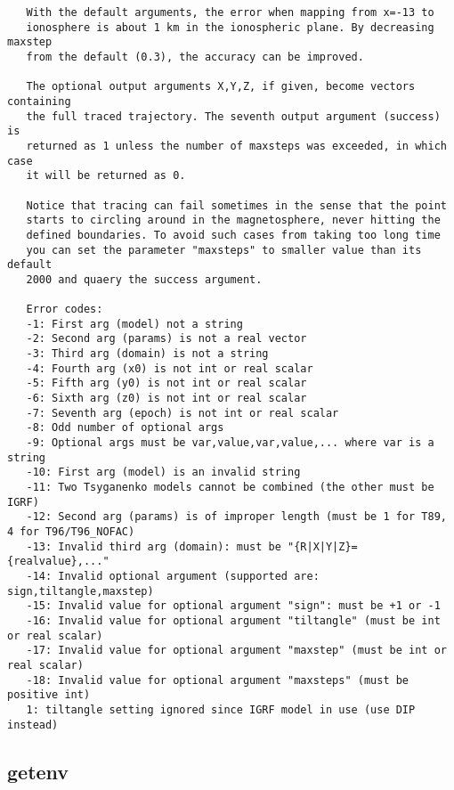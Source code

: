 \documentclass[a4paper]{article}
\begin{document}
\begin{tscreen}
\begin{verbatim}
   With the default arguments, the error when mapping from x=-13 to
   ionosphere is about 1 km in the ionospheric plane. By decreasing maxstep
   from the default (0.3), the accuracy can be improved.

   The optional output arguments X,Y,Z, if given, become vectors containing
   the full traced trajectory. The seventh output argument (success) is
   returned as 1 unless the number of maxsteps was exceeded, in which case
   it will be returned as 0.
   
   Notice that tracing can fail sometimes in the sense that the point
   starts to circling around in the magnetosphere, never hitting the
   defined boundaries. To avoid such cases from taking too long time
   you can set the parameter "maxsteps" to smaller value than its default
   2000 and quaery the success argument.

   Error codes:
   -1: First arg (model) not a string
   -2: Second arg (params) is not a real vector
   -3: Third arg (domain) is not a string
   -4: Fourth arg (x0) is not int or real scalar
   -5: Fifth arg (y0) is not int or real scalar
   -6: Sixth arg (z0) is not int or real scalar
   -7: Seventh arg (epoch) is not int or real scalar
   -8: Odd number of optional args
   -9: Optional args must be var,value,var,value,... where var is a string
   -10: First arg (model) is an invalid string
   -11: Two Tsyganenko models cannot be combined (the other must be IGRF)
   -12: Second arg (params) is of improper length (must be 1 for T89, 4 for T96/T96_NOFAC)
   -13: Invalid third arg (domain): must be "{R|X|Y|Z}={realvalue},..."
   -14: Invalid optional argument (supported are: sign,tiltangle,maxstep)
   -15: Invalid value for optional argument "sign": must be +1 or -1
   -16: Invalid value for optional argument "tiltangle" (must be int or real scalar)
   -17: Invalid value for optional argument "maxstep" (must be int or real scalar)
   -18: Invalid value for optional argument "maxsteps" (must be positive int)
   1: tiltangle setting ignored since IGRF model in use (use DIP instead)
\end{verbatim}
\end{tscreen}





\subsection{getenv\label{getenv}}
\end{document}
